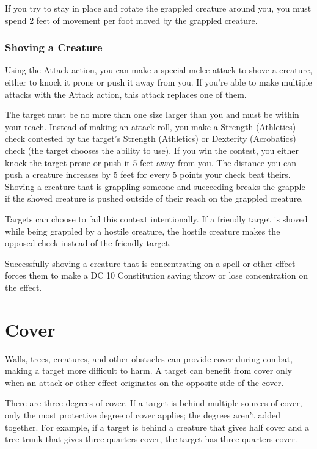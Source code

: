 If you try to stay in place and rotate the grappled creature around you, you must spend 2 feet of movement per foot moved by the grappled creature.

\subsubsection{Shoving a Creature}

Using the Attack action, you can make a special melee attack to shove a creature, either to knock it prone or push it away from you. If you're able to make multiple attacks with the Attack action, this attack replaces one of them.

The target must be no more than one size larger than you and must be within your reach. Instead of making an attack roll, you make a Strength (Athletics) check contested by the target's Strength (Athletics) or Dexterity (Acrobatics) check (the target chooses the ability to use). If you win the contest, you either knock the target prone or push it 5 feet away from you. The distance you can push a creature increases by 5 feet for every 5 points your check beat theirs. Shoving a creature that is grappling someone and succeeding breaks the grapple if the shoved creature is pushed outside of their reach on the grappled creature.

Targets can choose to fail this context intentionally. If a friendly target is shoved while being grappled by a hostile creature, the hostile creature makes the opposed check instead of the friendly target.

Successfully shoving a creature that is concentrating on a spell or other effect forces them to make a DC 10 Constitution saving throw or lose concentration on the effect.

\section{Cover}

Walls, trees, creatures, and other obstacles can provide cover during combat, making a target more difficult to harm. A target can benefit from cover only when an attack or other effect originates on the opposite side of the cover.

There are three degrees of cover. If a target is behind multiple sources of cover, only the most protective degree of cover applies; the degrees aren't added together. For example, if a target is behind a creature that gives half cover and a tree trunk that gives three-quarters cover, the target has three-quarters cover.

